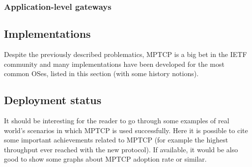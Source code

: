 \subsubsection{Application-level gateways}


\subsection{Implementations}
Despite the previously described problematics, MPTCP is a big bet in the IETF community and many implementations have been developed for the most common OSes, listed in this section (with some history notions).

\subsection{Deployment status}
It should be interesting for the reader to go through some examples of real world's scenarios in which MPTCP is used successfully. Here it is possible to cite some important achievements related to MPTCP (for example the highest throughput ever reached with the new protocol).
If available, it would be also good to show some graphs about MPTCP adoption rate or similar.